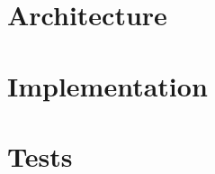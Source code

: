 \documentclass[a4paper, 11pt]{memoir}
\begin{document}
\chapter{Architecture}

\chapter{Implementation}

\chapter{Tests}



\backmatter




\listoffigures
\end{document}
